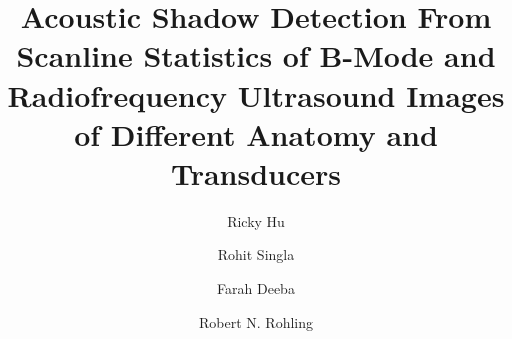 \documentclass[preprint,5p,authoryear]{elsarticle}
\begin{document}
\begin{frontmatter}



\title{Acoustic Shadow Detection From Scanline Statistics of B-Mode and Radiofrequency Ultrasound Images of Different Anatomy and Transducers}






\author[Affil1]{Ricky Hu }
\author[Affil1]{Rohit Singla}
\author[Affil1]{Farah Deeba}
\author[Affil1]{Robert N. Rohling}

\address[Affil1]{Department of Electrical and Computer Engineering, University of British Columbia, Vancouver, Canada}



\end{frontmatter}
\end{document}
